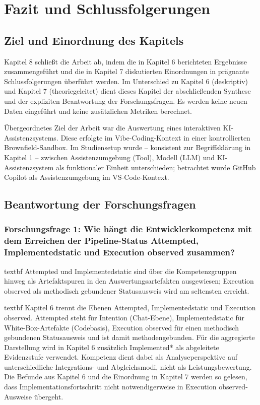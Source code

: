 \chapter{Fazit und Schlussfolgerungen}
\label{chap:fazit}

\section{Ziel und Einordnung des Kapitels}
Kapitel 8 schließt die Arbeit ab, indem die in Kapitel 6 berichteten Ergebnisse zusammengeführt und die in Kapitel 7 diskutierten Einordnungen in prägnante Schlussfolgerungen überführt werden. Im Unterschied zu Kapitel 6 (deskriptiv) und Kapitel 7 (theoriegeleitet) dient dieses Kapitel der abschließenden Synthese und der expliziten Beantwortung der Forschungsfragen. Es werden keine neuen Daten eingeführt und keine zusätzlichen Metriken berechnet.

Übergeordnetes Ziel der Arbeit war die Auswertung eines interaktiven KI-Assistenzsystems. Diese erfolgte im Vibe-Coding-Kontext in einer kontrollierten Brownfield-Sandbox. Im Studiensetup wurde -- konsistent zur Begriffsklärung in Kapitel 1 -- zwischen Assistenzumgebung (Tool), Modell (LLM) und KI-Assistenzsystem als funktionaler Einheit unterschieden; betrachtet wurde GitHub Copilot als Assistenzumgebung im VS-Code-Kontext.

\section{Beantwortung der Forschungsfragen}

\subsection[Forschungsfrage 1: Kompetenz und Pipeline-Status]{Forschungsfrage 1: Wie hängt die Entwicklerkompetenz mit dem Erreichen der Pipeline-Status Attempted, Implementedstatic und Execution observed zusammen?}

\noindent \csname textbf Attempted und Implementedstatic sind über die Kompetenzgruppen hinweg als Artefaktspuren in den Auswertungsartefakten ausgewiesen; Execution observed als methodisch gebundener Statusausweis wird am seltensten erreicht.

\csname textbf Kapitel 6 trennt die Ebenen Attempted, Implementedstatic und Execution observed. Attempted steht für Intention (Chat-Ebene), Implementedstatic für White-Box-Artefakte (Codebasis), Execution observed für einen methodisch gebundenen Statusausweis und ist damit methodengebunden. Für die aggregierte Darstellung wird in Kapitel 6 zusätzlich Implemented* als abgeleitete Evidenzstufe verwendet. Kompetenz dient dabei als Analyseperspektive auf unterschiedliche Integrations- und Abgleichsmodi, nicht als Leistungsbewertung. Die Befunde aus Kapitel 6 und die Einordnung in Kapitel 7 werden so gelesen, dass Implementationsfortschritt nicht notwendigerweise in Execution observed-Ausweise übergeht.

